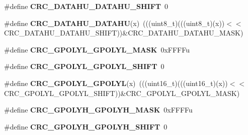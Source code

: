 \begin{DoxyCompactItemize}
\item 
\#define {\bfseries C\+R\+C\+\_\+\+D\+A\+T\+A\+H\+U\+\_\+\+D\+A\+T\+A\+H\+U\+\_\+\+S\+H\+I\+FT}~0\hypertarget{group__CRC__Register__Masks_ga171e0d5a315574e858cf58e22957f131}{}\label{group__CRC__Register__Masks_ga171e0d5a315574e858cf58e22957f131}

\item 
\#define {\bfseries C\+R\+C\+\_\+\+D\+A\+T\+A\+H\+U\+\_\+\+D\+A\+T\+A\+HU}(x)~(((uint8\+\_\+t)(((uint8\+\_\+t)(x))$<$$<$C\+R\+C\+\_\+\+D\+A\+T\+A\+H\+U\+\_\+\+D\+A\+T\+A\+H\+U\+\_\+\+S\+H\+I\+FT))\&C\+R\+C\+\_\+\+D\+A\+T\+A\+H\+U\+\_\+\+D\+A\+T\+A\+H\+U\+\_\+\+M\+A\+SK)\hypertarget{group__CRC__Register__Masks_gae1736710c36588af1ecc3b6ecb3707e1}{}\label{group__CRC__Register__Masks_gae1736710c36588af1ecc3b6ecb3707e1}

\item 
\#define {\bfseries C\+R\+C\+\_\+\+G\+P\+O\+L\+Y\+L\+\_\+\+G\+P\+O\+L\+Y\+L\+\_\+\+M\+A\+SK}~0x\+F\+F\+F\+Fu\hypertarget{group__CRC__Register__Masks_ga7512a0f84b048e7a54207f9a7e619494}{}\label{group__CRC__Register__Masks_ga7512a0f84b048e7a54207f9a7e619494}

\item 
\#define {\bfseries C\+R\+C\+\_\+\+G\+P\+O\+L\+Y\+L\+\_\+\+G\+P\+O\+L\+Y\+L\+\_\+\+S\+H\+I\+FT}~0\hypertarget{group__CRC__Register__Masks_gaf4e5ed1d1478c1a6c8c5681e2b1d24aa}{}\label{group__CRC__Register__Masks_gaf4e5ed1d1478c1a6c8c5681e2b1d24aa}

\item 
\#define {\bfseries C\+R\+C\+\_\+\+G\+P\+O\+L\+Y\+L\+\_\+\+G\+P\+O\+L\+YL}(x)~(((uint16\+\_\+t)(((uint16\+\_\+t)(x))$<$$<$C\+R\+C\+\_\+\+G\+P\+O\+L\+Y\+L\+\_\+\+G\+P\+O\+L\+Y\+L\+\_\+\+S\+H\+I\+FT))\&C\+R\+C\+\_\+\+G\+P\+O\+L\+Y\+L\+\_\+\+G\+P\+O\+L\+Y\+L\+\_\+\+M\+A\+SK)\hypertarget{group__CRC__Register__Masks_ga5eb41c10ffbf64defaef2101a9036e32}{}\label{group__CRC__Register__Masks_ga5eb41c10ffbf64defaef2101a9036e32}

\item 
\#define {\bfseries C\+R\+C\+\_\+\+G\+P\+O\+L\+Y\+H\+\_\+\+G\+P\+O\+L\+Y\+H\+\_\+\+M\+A\+SK}~0x\+F\+F\+F\+Fu\hypertarget{group__CRC__Register__Masks_ga15ab1d296a857eebfbb3e5894ddd9302}{}\label{group__CRC__Register__Masks_ga15ab1d296a857eebfbb3e5894ddd9302}

\item 
\#define {\bfseries C\+R\+C\+\_\+\+G\+P\+O\+L\+Y\+H\+\_\+\+G\+P\+O\+L\+Y\+H\+\_\+\+S\+H\+I\+FT}~0\hypertarget{group__CRC__Register__Masks_ga62fa126178d7137b39b75ad2d63edae9}{}\label{group__CRC__Register__Masks_ga62fa126178d7137b39b75ad2d63edae9}


\end{DoxyCompactItemize}
